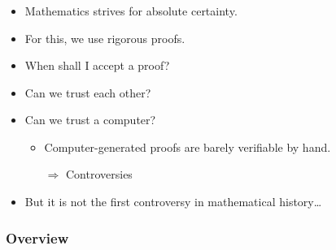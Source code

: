\documentclass{beamer}
\begin{document}
\begin{frame}
    \frametitle{}
    \begin{itemize}[<+->]
	\item Mathematics strives for absolute certainty.
	\item For this, we use rigorous proofs.
	\item When shall I accept a proof?
	\item Can we trust each other?
	\item Can we trust a computer?
	\begin{itemize}
		\item Computer-generated proofs are barely verifiable by hand.
		\item[$\Rightarrow$] Controversies
	\end{itemize}
	\item But it is not the first controversy in mathematical history\ldots
    \end{itemize}
\end{frame}

\begin{frame}
    \frametitle{Overview} 
        \tableofcontents
\end{frame}
\end{document}
